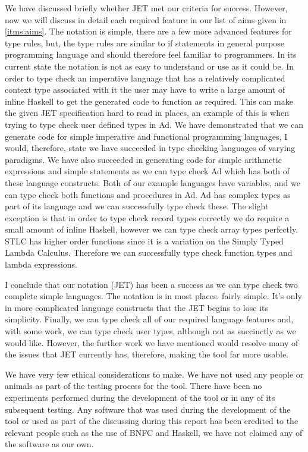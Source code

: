 We have discussed briefly whether JET met our criteria for success.
However, now we will discuss in detail each required feature in our list of aims given in \autoref{itms:aims}.
The notation is simple, there are a few more advanced features for type rules, but, the type rules are similar to if statements in general purpose programming language and should therefore feel familiar to programmers.
In its current state the notation is not as easy to understand or use as it could be.
In order to type check an imperative language that has a relatively complicated context type associated with it the user may have to write a large amount of inline Haskell to get the generated code to function as required.
This can make the given JET specification hard to read in places, an example of this is when trying to type check user defined types in Ad.
We have demonstrated that we can generate code for simple imperative and functional programming languages, I would, therefore, state we have succeeded in type checking languages of varying paradigms.
We have also succeeded in generating code for simple arithmetic expressions and simple statements as we can type check Ad which has both of these language constructs.
Both of our example languages have variables, and we can type check both functions and procedures in Ad.
Ad has complex types as part of its language and we can successfully type check these.
The slight exception is that in order to type check record types correctly we do require a small amount of inline Haskell, however we can type check array types perfectly.
STLC has higher order functions since it is a variation on the Simply Typed Lambda Calculus.
Therefore we can successfully type check function types and lambda expressions.

I conclude that our notation (JET) has been a success as we can type check two complete simple languages. 
The notation is in most places. fairly simple.
It's only in more complicated language constructs that the JET begins to lose its simplicity.
Finally, we can type check all of our required language features and, with some work, we can type check user types, although not as succinctly as we would like.
However, the further work we have mentioned would resolve many of the issues that JET currently has, therefore, making the tool far more usable.

We have very few ethical considerations to make.
We have not used any people or animals as part of the testing process for the tool.
There have been no experiments performed during the development of the tool or in any of its subsequent testing.
Any software that was used during the development of the tool or used as part of the discussing during this report has been credited to the relevant people such as the use of BNFC and Haskell, we have not claimed any of the software as our own.

